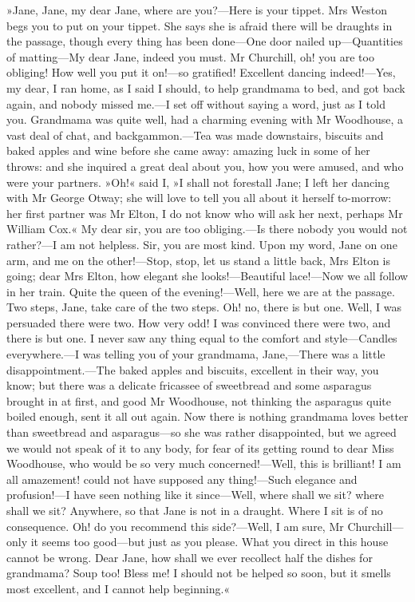 »Jane, Jane, my dear Jane, where are you?—Here is your tippet. Mrs Weston begs you to put on your tippet. She says she is afraid there will be draughts in the passage, though every thing has been done—One door nailed up—Quantities of matting—My dear Jane, indeed you must. Mr Churchill, oh! you are too obliging! How well you put it on!—so gratified! Excellent dancing indeed!—Yes, my dear, I ran home, as I said I should, to help grandmama to bed, and got back again, and nobody missed me.—I set off without saying a word, just as I told you. Grandmama was quite well, had a charming evening with Mr Woodhouse, a vast deal of chat, and backgammon.—Tea was made downstairs, biscuits and baked apples and wine before she came away: amazing luck in some of her throws: and she inquired a great deal about you, how you were amused, and who were your partners. »Oh!« said I, »I shall not forestall Jane; I left her dancing with Mr George Otway; she will love to tell you all about it herself to-morrow: her first partner was Mr Elton, I do not know who will ask her next, perhaps Mr William Cox.« My dear sir, you are too obliging.—Is there nobody you would not rather?—I am not helpless. Sir, you are most kind. Upon my word, Jane on one arm, and me on the other!—Stop, stop, let us stand a little back, Mrs Elton is going; dear Mrs Elton, how elegant she looks!—Beautiful lace!—Now we all follow in her train. Quite the queen of the evening!—Well, here we are at the passage. Two steps, Jane, take care of the two steps. Oh! no, there is but one. Well, I was persuaded there were two. How very odd! I was convinced there were two, and there is but one. I never saw any thing equal to the comfort and style—Candles everywhere.—I was telling you of your grandmama, Jane,—There was a little disappointment.—The baked apples and biscuits, excellent in their way, you know; but there was a delicate fricassee of sweetbread and some asparagus brought in at first, and good Mr Woodhouse, not thinking the asparagus quite boiled enough, sent it all out again. Now there is nothing grandmama loves better than sweetbread and asparagus—so she was rather disappointed, but we agreed we would not speak of it to any body, for fear of its getting round to dear Miss Woodhouse, who would be so very much concerned!—Well, this is brilliant! I am all amazement! could not have supposed any thing!—Such elegance and profusion!—I have seen nothing like it since—Well, where shall we sit? where shall we sit? Anywhere, so that Jane is not in a draught. Where I sit is of no consequence. Oh! do you recommend this side?—Well, I am sure, Mr Churchill—only it seems too good—but just as you please. What you direct in this house cannot be wrong. Dear Jane, how shall we ever recollect half the dishes for grandmama? Soup too! Bless me! I should not be helped so soon, but it smells most excellent, and I cannot help beginning.«

